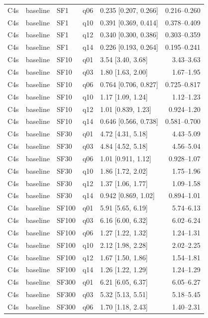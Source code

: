 \begin{longtable}{lllllr}
C4s & baseline & SF1 & q06 & 0.235 [0.207, 0.266] & 0.216--0.260 \\
C4s & baseline & SF1 & q10 & 0.391 [0.369, 0.414] & 0.378--0.409 \\
C4s & baseline & SF1 & q12 & 0.340 [0.300, 0.386] & 0.303--0.359 \\
C4s & baseline & SF1 & q14 & 0.226 [0.193, 0.264] & 0.195--0.241 \\
C4s & baseline & SF10 & q01 & 3.54 [3.40, 3.68] & 3.43--3.63 \\
C4s & baseline & SF10 & q03 & 1.80 [1.63, 2.00] & 1.67--1.95 \\
C4s & baseline & SF10 & q06 & 0.764 [0.706, 0.827] & 0.725--0.817 \\
C4s & baseline & SF10 & q10 & 1.17 [1.09, 1.24] & 1.12--1.23 \\
C4s & baseline & SF10 & q12 & 1.01 [0.839, 1.23] & 0.924--1.20 \\
C4s & baseline & SF10 & q14 & 0.646 [0.566, 0.738] & 0.581--0.700 \\
C4s & baseline & SF30 & q01 & 4.72 [4.31, 5.18] & 4.43--5.09 \\
C4s & baseline & SF30 & q03 & 4.84 [4.52, 5.18] & 4.56--5.04 \\
C4s & baseline & SF30 & q06 & 1.01 [0.911, 1.12] & 0.928--1.07 \\
C4s & baseline & SF30 & q10 & 1.86 [1.72, 2.02] & 1.75--1.96 \\
C4s & baseline & SF30 & q12 & 1.37 [1.06, 1.77] & 1.09--1.58 \\
C4s & baseline & SF30 & q14 & 0.942 [0.869, 1.02] & 0.894--1.01 \\
C4s & baseline & SF100 & q01 & 5.91 [5.65, 6.19] & 5.74--6.13 \\
C4s & baseline & SF100 & q03 & 6.16 [6.00, 6.32] & 6.02--6.24 \\
C4s & baseline & SF100 & q06 & 1.27 [1.22, 1.32] & 1.24--1.31 \\
C4s & baseline & SF100 & q10 & 2.12 [1.98, 2.28] & 2.02--2.25 \\
C4s & baseline & SF100 & q12 & 1.67 [1.50, 1.86] & 1.54--1.81 \\
C4s & baseline & SF100 & q14 & 1.26 [1.22, 1.29] & 1.24--1.29 \\
C4s & baseline & SF300 & q01 & 6.21 [6.05, 6.37] & 6.05--6.27 \\
C4s & baseline & SF300 & q03 & 5.32 [5.13, 5.51] & 5.18--5.45 \\
C4s & baseline & SF300 & q06 & 1.70 [1.18, 2.43] & 1.40--2.31 \\

\end{longtable}
